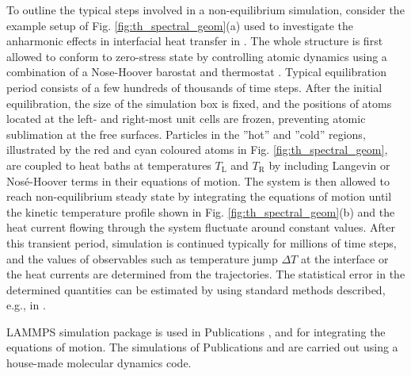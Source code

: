 To outline the typical steps involved in a non-equilibrium simulation, consider the example setup of Fig. \ref{fig:th_spectral_geom}(a) used to investigate the anharmonic effects in interfacial heat transfer in . The whole structure is first allowed to conform to zero-stress state by controlling atomic dynamics using a combination of a Nose-Hoover barostat and thermostat \cite{allentildesley}. Typical equilibration period consists of a few hundreds of thousands of time steps. After the initial equilibration, the size of the simulation box is fixed, and the positions of atoms located at the left- and right-most unit cells are frozen, preventing atomic sublimation at the free surfaces. Particles in the ''hot'' and ''cold'' regions, illustrated by the red and cyan coloured atoms in Fig. \ref{fig:th_spectral_geom}, are coupled to heat baths at temperatures $T_{\textrm{L}}$ and $T_{\textrm{R}}$ by including Langevin or Nos\'e-Hoover terms in their equations of motion. The system is then allowed to reach non-equilibrium steady state by integrating the equations of motion until the kinetic temperature profile shown in Fig. \ref{fig:th_spectral_geom}(b) and the heat current flowing through the system fluctuate around constant values. After this transient period, simulation is continued typically for millions of time steps, and the values of observables such as temperature jump $\Delta T$ at the interface or the heat currents are determined from the trajectories. The statistical error in the determined quantities can be estimated by using standard methods described, e.g., in \cite{allentildesley}.

LAMMPS simulation package \cite{plimpton95,lammps_website} is used in Publications ,  and  for integrating the equations of motion. The simulations of Publications  and  are carried out using a house-made molecular dynamics code. 


\iffalse


